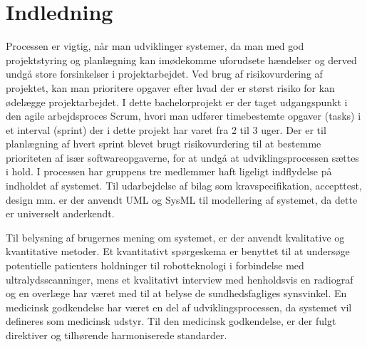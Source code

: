 \chapter{Indledning}\label{kapInd}
Processen er vigtig, når man udviklinger systemer, da man med god projektstyring og planlægning kan imødekomme uforudsete hændelser og derved undgå store forsinkelser i projektarbejdet. Ved brug af risikovurdering af projektet, kan man prioritere opgaver efter hvad der er størst risiko for kan ødelægge projektarbejdet. I dette bachelorprojekt er der taget udgangspunkt i den agile arbejdsproces Scrum, hvori man udfører timebestemte opgaver (tasks) i et interval (sprint) der i dette projekt har varet fra 2 til 3 uger. Der er til planlægning af hvert sprint blevet brugt risikovurdering til at bestemme prioriteten af især softwareopgaverne, for at undgå at udviklingsprocessen sættes i hold. 
I processen har gruppens tre medlemmer haft ligeligt indflydelse på indholdet af systemet. Til udarbejdelse af bilag som kravspecifikation, accepttest, design mm. er der anvendt UML og SysML til modellering af systemet, da dette er universelt anderkendt.

Til belysning af brugernes mening om systemet, er der anvendt kvalitative og kvantitative
metoder. Et kvantitativt spørgeskema er benyttet til at undersøge potentielle patienters
holdninger til robotteknologi i forbindelse med ultralydsscanninger, mens et kvalitativt
interview med henholdsvis en radiograf og en overlæge har været med til at belyse de sundhedsfagliges
synsvinkel. En medicinsk godkendelse har været en del af udviklingsprocessen, da systemet
vil defineres som medicinsk udstyr. Til den medicinsk godkendelse, er der fulgt direktiver og tilhørende harmoniserede standarder. 



